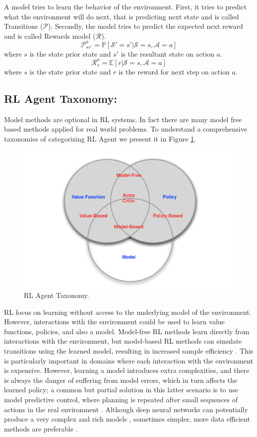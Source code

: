 A model tries to learn the behavior of the environment. First, it tries to predict what the environment will do next, that is predicting next state and is called Transitions ($\mathcal{P}$). Secondly, the model tries to predict the expected next reward and is called Rewards model ($\mathcal{R}$).
$$\mathcal{P}^a_{ss'} = \mathbb{P}[\mathcal{S}' =s'| \mathcal{S}=s, \mathcal{A} =a]$$
where $s$ is the state prior state and $s'$ is the resultant state on action $a$.
$$\mathcal{R}^a_s = \mathbb{E}[r|\mathcal{S}=s,\mathcal{A}=a]$$
where $s$ is the state prior state and $r$ is the reward for next step on action $a$.

\subsection{RL Agent Taxonomy:}
Model methods are optional in RL systems. In fact there are many model free based methods applied for real world problems. To understand a comprehensive taxonomies of categorizing RL Agent we present it in Figure \ref{fig:taxonomy}.

\begin{figure}[t]
	\includegraphics[width=0.7\linewidth ]{fig/taxonomy.png}
    \vspace{-2mm}
    \caption{RL Agent Taxonomy.}
    \label{fig:taxonomy}
\end{figure}

RL focus on learning without access to the underlying
model of the environment. However, interactions with the
environment could be used to learn value functions, policies,
and also a model. Model-free RL methods learn directly
from interactions with the environment, but model-based RL
methods can simulate transitions using the learned model,
resulting in increased sample efficiency \cite{arulkumaran2017brief}. This is particularly
important in domains where each interaction with the environment
is expensive. However, learning a model introduces extra
complexities, and there is always the danger of suffering from
model errors, which in turn affects the learned policy; a common
but partial solution in this latter scenario is to use model
predictive control, where planning is repeated after small
sequences of actions in the real environment \cite{bertsekas2005dynamic}.
Although
deep neural networks can potentially produce a very complex
and rich models \cite{oh2015action, finn2016deep}, sometimes simpler, more data efficient
methods are preferable \cite{gu2016continuous}.

